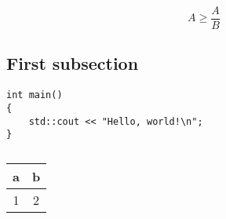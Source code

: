 \documentclass[10pt, titlepage, oneside, a4paper]{article}
\begin{document}
	\begin{equation}
		A \geq \frac{A}{B}
		\label{equ:}
	\end{equation}

	\subsection{First subsection}

		\begin{verbatim}
int main()
{
	std::cout << "Hello, world!\n";
}
		\end{verbatim}

		\begin{table}[H]
			\centering
			\small
			\begin{tabular}{|c|c|}
				\hline
				a & b \\
				\hline
				1 & 2 \\
				\hline
			\end{tabular}
			\caption{}
			\label{tab:}
		\end{table}
\end{document}
